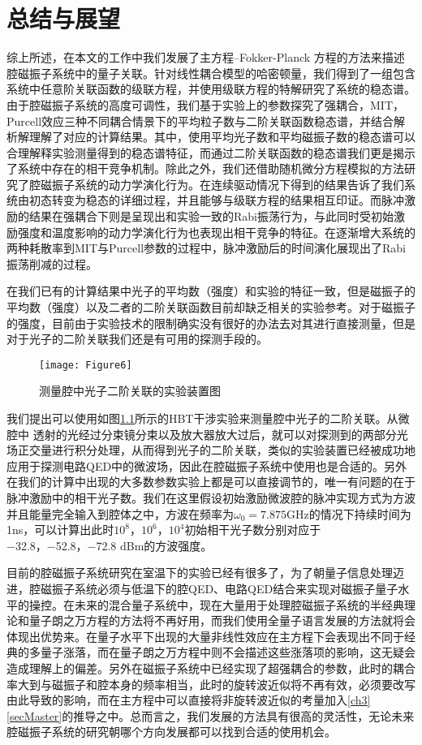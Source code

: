 
\chapter{总结与展望}
\label{ch6}

综上所述，在本文的工作中我们发展了主方程--Fokker-Planck 方程的方法来描述腔磁振子系统中的量子关联。针对线性耦合模型的哈密顿量，我们得到了一组包含系统中任意阶关联函数的级联方程，并使用级联方程的特解研究了系统的稳态谱。由于腔磁振子系统的高度可调性，我们基于实验上的参数探究了强耦合，MIT，Purcell效应三种不同耦合情景下的平均粒子数与二阶关联函数稳态谱，并结合解析解理解了对应的计算结果。其中，使用平均光子数和平均磁振子数的稳态谱可以合理解释实验测量得到的稳态谱特征，而通过二阶关联函数的稳态谱我们更是揭示了系统中存在的相干竞争机制。除此之外，我们还借助随机微分方程模拟的方法研究了腔磁振子系统的动力学演化行为。在连续驱动情况下得到的结果告诉了我们系统由初态转变为稳态的详细过程，并且能够与级联方程的结果相互印证。而脉冲激励的结果在强耦合下则是呈现出和实验一致的Rabi振荡行为，与此同时受初始激励强度和温度影响的动力学演化行为也表现出相干竞争的特征。在逐渐增大系统的两种耗散率到MIT与Purcell参数的过程中，脉冲激励后的时间演化展现出了Rabi振荡削减的过程。

在我们已有的计算结果中光子的平均数（强度）和实验的特征一致，但是磁振子的平均数（强度）以及二者的二阶关联函数目前却缺乏相关的实验参考。对于磁振子的强度，目前由于实验技术的限制确实没有很好的办法去对其进行直接测量，但是对于光子的二阶关联我们还是有可用的探测手段的。
\begin{figure}[htbp]
	\centering
	\texttt{[image: Figure6]}
	\caption{测量腔中光子二阶关联的实验装置图} 
	\label{HBTExperiment}
\end{figure}
我们提出可以使用如图\ref{HBTExperiment}所示的HBT干涉实验来测量腔中光子的二阶关联。从微腔中
透射的光经过分束镜分束以及放大器放大过后，就可以对探测到的两部分光场正交量进行积分处理，从而得到光子的二阶关联，类似的实验装置已经被成功地应用于探测电路QED中的微波场，因此在腔磁振子系统中使用也是合适的。另外在我们的计算中出现的大多数参数实验上都是可以直接调节的，唯一有问题的在于脉冲激励中的相干光子数。我们在这里假设初始激励微波腔的脉冲实现方式为方波并且能量完全输入到腔体之中，方波在频率为$\omega_0=7.875$GHz的情况下持续时间为1ns，可以计算出此时$10^8$，$10^6$，$10^4$初始相干光子数分别对应于−32.8，−52.8，−72.8 dBm的方波强度。

目前的腔磁振子系统研究在室温下的实验已经有很多了，为了朝量子信息处理迈进，腔磁振子系统必须与低温下的腔QED、电路QED结合来实现对磁振子量子水平的操控。在未来的混合量子系统中，现在大量用于处理腔磁振子系统的半经典理论和量子朗之万方程的方法将不再好用，而我们使用全量子语言发展的方法就将会体现出优势来。在量子水平下出现的大量非线性效应在主方程下会表现出不同于经典的多量子涨落，而在量子朗之万方程中则不会描述这些涨落项的影响，这无疑会造成理解上的偏差。另外在磁振子系统中已经实现了超强耦合的参数，此时的耦合率大到与磁振子和腔本身的频率相当，此时的旋转波近似将不再有效，必须要改写由此导致的影响，而在主方程中可以直接将非旋转波近似的考量加入\ref{ch3}\ref{secMaster}的推导之中。总而言之，我们发展的方法具有很高的灵活性，无论未来腔磁振子系统的研究朝哪个方向发展都可以找到合适的使用机会。